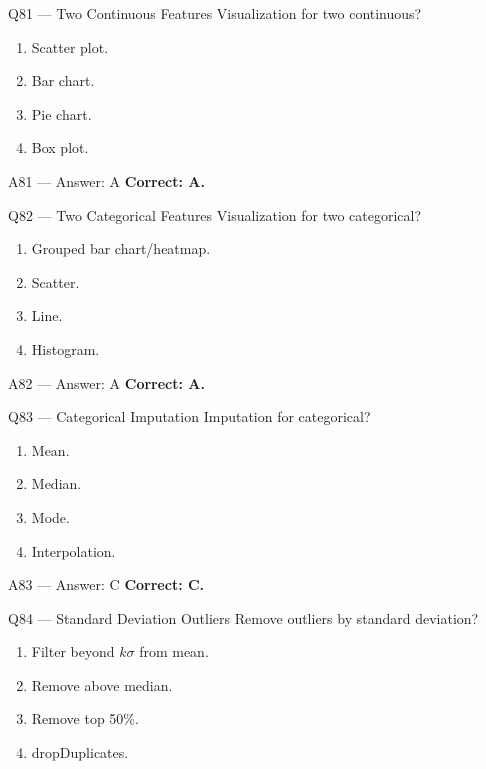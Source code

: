 \documentclass[aspectratio=169,9pt]{beamer}
\begin{document}
	\begin{frame}{Q81 — Two Continuous Features}
		Visualization for two continuous?
		\begin{enumerate}[label=\Alph*.]
			\item Scatter plot.
			\item Bar chart.
			\item Pie chart.
			\item Box plot.
		\end{enumerate}
	\end{frame}
	
	\begin{frame}{A81 — Answer: A}
		\textbf{Correct: A.}
	\end{frame}
	
	\begin{frame}{Q82 — Two Categorical Features}
		Visualization for two categorical?
		\begin{enumerate}[label=\Alph*.]
			\item Grouped bar chart/heatmap.
			\item Scatter.
			\item Line.
			\item Histogram.
		\end{enumerate}
	\end{frame}
	
	\begin{frame}{A82 — Answer: A}
		\textbf{Correct: A.}
	\end{frame}
	
	\begin{frame}{Q83 — Categorical Imputation}
		Imputation for categorical?
		\begin{enumerate}[label=\Alph*.]
			\item Mean.
			\item Median.
			\item Mode.
			\item Interpolation.
		\end{enumerate}
	\end{frame}
	
	\begin{frame}{A83 — Answer: C}
		\textbf{Correct: C.}
	\end{frame}
	
	\begin{frame}{Q84 — Standard Deviation Outliers}
		Remove outliers by standard deviation?
		\begin{enumerate}[label=\Alph*.]
			\item Filter beyond $k\sigma$ from mean.
			\item Remove above median.
			\item Remove top 50\%.
			\item dropDuplicates.
		\end{enumerate}
	\end{frame}
	
\end{document}
